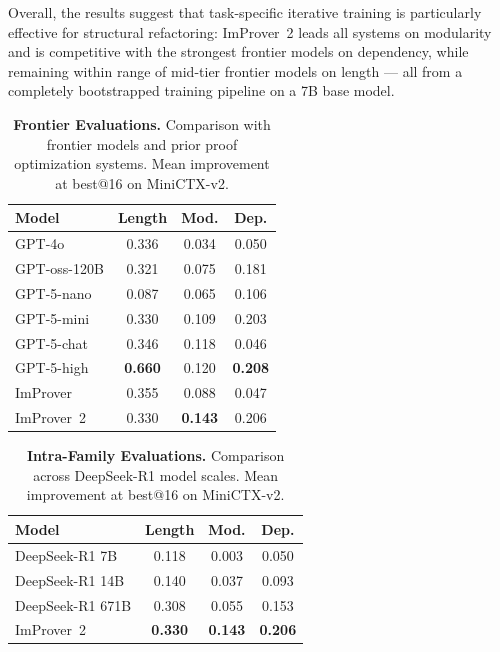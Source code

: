 Overall, the results suggest that task-specific iterative training is particularly effective for structural refactoring: ImProver~2 leads all systems on modularity and is competitive with the strongest frontier models on dependency, while remaining within range of mid-tier frontier models on length --- all from a completely bootstrapped training pipeline on a 7B base model.

\begin{table}[ht]
\centering
\caption{\textbf{Frontier Evaluations.} Comparison with frontier models and prior proof optimization systems. Mean improvement at best@16 on MiniCTX-v2.}
\label{tab:imp2_frontier}
\small
\begin{tabular}{l|ccc}
\toprule
\textbf{Model} & \textbf{Length} & \textbf{Mod.} & \textbf{Dep.} \\
\midrule
GPT-4o          & 0.336 & 0.034 & 0.050 \\
GPT-oss-120B    & 0.321 & 0.075 & 0.181 \\
GPT-5-nano      & 0.087 & 0.065 & 0.106 \\
GPT-5-mini      & 0.330 & 0.109 & 0.203 \\
GPT-5-chat      & 0.346 & 0.118 & 0.046 \\
GPT-5-high      & \textbf{0.660} & 0.120 & \textbf{0.208} \\
\midrule
ImProver        & 0.355 & 0.088 & 0.047 \\
ImProver~2      & 0.330 & \textbf{0.143} & 0.206 \\
\bottomrule
\end{tabular}
\end{table}

\begin{table}[ht]
\centering
\caption{\textbf{Intra-Family Evaluations.} Comparison across DeepSeek-R1 model scales. Mean improvement at best@16 on MiniCTX-v2.}
\label{tab:imp2_intrafamily}
\small
\begin{tabular}{l|ccc}
\toprule
\textbf{Model} & \textbf{Length} & \textbf{Mod.} & \textbf{Dep.} \\
\midrule
DeepSeek-R1 7B   & 0.118 & 0.003 & 0.050 \\
DeepSeek-R1 14B  & 0.140 & 0.037 & 0.093 \\
DeepSeek-R1 671B & 0.308 & 0.055 & 0.153 \\
\midrule
ImProver~2       & \textbf{0.330} & \textbf{0.143} & \textbf{0.206} \\
\bottomrule
\end{tabular}
\end{table}


